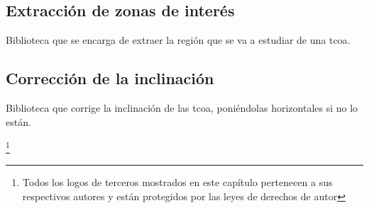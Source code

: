 \subsection{Extracción de zonas de interés}
Biblioteca que se encarga de extraer la región que se va a estudiar de
una \gls{tcoa}.

\subsection{Corrección de la inclinación}
Biblioteca que corrige la inclinación de las \gls{tcoa}, poniéndolas
horizontales si no lo están.

\let\thefootnote\relax\footnote{Todos los logos de terceros mostrados
  en este capítulo pertenecen a sus respectivos autores y están
  protegidos por las leyes de derechos de autor}
